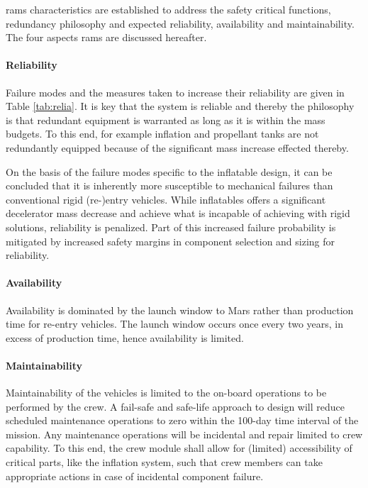 \acrfull{rams} characteristics are established to address the safety critical functions, redundancy philosophy and expected reliability, availability and maintainability. The four aspects \gls{rams} are discussed hereafter.

\paragraph{Reliability}
Failure modes and the measures taken to increase their reliability are given in Table \ref{tab:relia}. It is key that the system is reliable and thereby the philosophy is that redundant equipment is warranted as long as it is within the mass budgets. To this end, for example inflation and propellant tanks are not redundantly equipped because of the significant mass increase effected thereby. 

On the basis of the failure modes specific to the inflatable design, it can be concluded that it is inherently more susceptible to mechanical failures than conventional rigid (re-)entry vehicles. While inflatables offers a significant decelerator mass decrease and achieve what is incapable of achieving with rigid solutions, reliability is penalized. Part of this increased failure probability is mitigated by increased safety margins in component selection and sizing for reliability.

\paragraph{Availability}
Availability is dominated by the launch window to Mars rather than production time for re-entry vehicles. The launch window occurs once every two years, in excess of production time, hence availability is limited. 

\paragraph{Maintainability}
Maintainability of the vehicles is limited to the on-board operations to be performed by the crew. A fail-safe and safe-life approach to design will reduce scheduled maintenance operations to zero within the 100-day time interval of the mission. Any maintenance operations will be incidental and repair limited to crew capability. To this end, the crew module shall allow for (limited) accessibility of critical parts, like the inflation system, such that crew members can take appropriate actions in case of incidental component failure.

